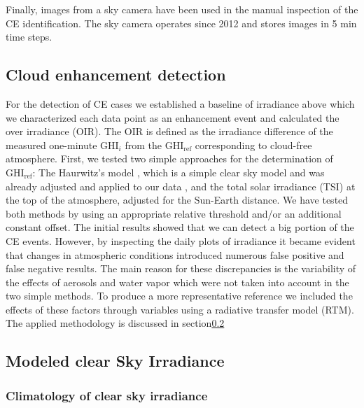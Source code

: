 \documentclass[preprint, 5p,
authoryear]{elsarticle} %
\begin{document}
Finally, images from a sky camera have been used in the manual
inspection of the CE identification. The sky camera operates since 2012
and stores images in 5 min time steps.

\hypertarget{cloud-enhancement-detection}{%
\subsection{Cloud enhancement
detection}\label{cloud-enhancement-detection}}

For the detection of CE cases we established a baseline of irradiance
above which we characterized each data point as an enhancement event and
calculated the over irradiance (OIR). The OIR is defined as the
irradiance difference of the measured one-minute \(\text{GHI}_i\) from
the \(\text{GHI}_\text{ref}\) corresponding to cloud-free atmosphere.
First, we tested two simple approaches for the determination of
\(\text{GHI}_\text{ref}\): The Haurwitz's model \citep{Haurwitz1945},
which is a simple clear sky model and was already adjusted and applied
to our data \citep{Natsis2023}, and the total solar irradiance (TSI) at
the top of the atmosphere, adjusted for the Sun-Earth distance. We have
tested both methods by using an appropriate relative threshold and/or an
additional constant offset. The initial results showed that we can
detect a big portion of the CE events. However, by inspecting the daily
plots of irradiance it became evident that changes in atmospheric
conditions introduced numerous false positive and false negative
results. The main reason for these discrepancies is the variability of
the effects of aerosols and water vapor which were not taken into
account in the two simple methods. To produce a more representative
reference we included the effects of these factors through variables
using a radiative transfer model (RTM). The applied methodology is
discussed in section\nobreakspace{}\ref{rtmcs}

\hypertarget{rtmcs}{%
\subsection{Modeled clear Sky Irradiance}\label{rtmcs}}

\hypertarget{climatology-of-clear-sky-irradiance}{%
\subsubsection{Climatology of clear sky
irradiance}\label{climatology-of-clear-sky-irradiance}}
\end{document}
